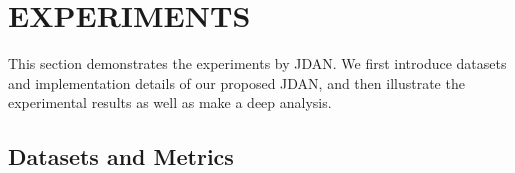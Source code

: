 \documentclass[acmsmall]{acmart}
\begin{document}


\section{EXPERIMENTS}
This section demonstrates the experiments by JDAN. 
We first introduce datasets and implementation details of our proposed JDAN, 
and then illustrate the experimental results as well as make a deep analysis. 

\subsection{Datasets and Metrics}
\end{document}
